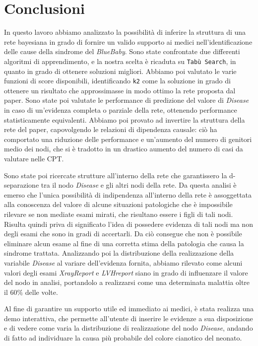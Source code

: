 \chapter{Conclusioni}
In questo lavoro abbiamo analizzato la possibilità di inferire la struttura di una rete bayesiana in grado di fornire un valido supporto ai medici nell'identificazione delle cause della sindrome del \textit{BlueBaby}. Sono state confrontate due differenti algoritmi di apprendimento, e la nostra scelta è ricaduta su \texttt{Tabù Search}, in quanto in grado di ottenere soluzioni migliori. Abbiamo poi valutato le varie funzioni di score disponibili, identificando \texttt{k2} come la soluzione in grado di ottenere un risultato che approssimasse in modo ottimo la rete proposta dal paper.
Sono state poi valutate le performance di predizione del valore di \textit{Disease} in caso di un'evidenza completa o parziale della rete, ottenendo performance statisticamente equivalenti. Abbiamo poi provato ad invertire la struttura della rete del paper, capovolgendo le relazioni di dipendenza causale: ciò ha comportato una riduzione delle performance e un'aumento del numero di genitori medio dei nodi, che si è tradotto in un drastico aumento del numero di casi da valutare nelle CPT.

Sono state poi ricercate strutture all'interno della rete che garantissero la d-separazione tra il nodo \textit{Disease} e gli altri nodi della rete. Da questa analisi è emerso che l'unica possibilità di indipendenza all'interno della rete è assoggettata alla conoscenza del valore di alcune situazioni patologiche che è impossibile rilevare se non mediate esami mirati, che risultano essere i figli di tali nodi. Risulta quindi priva di significato l'idea di possedere evidenza di tali nodi ma non degli esami che sono in gradi di accertarli. Da ciò consegue che non è possibile eliminare alcun esame al fine di una corretta stima della patologia che causa la sindrome trattata.
Analizzando poi la distribuzione della realizzazione della variabile \textit{Disease} al variare dell'evidenza fornita, abbiamo rilevato come alcuni valori degli esami \textit{XrayReport} e \textit{LVHreport} siano in grado di influenzare il valore del nodo in analisi, portandolo a realizzarsi come una determinata malattia oltre il $60\%$ delle volte.

Al fine di garantire un supporto utile ed immediato ai medici, è stata realizza una demo interattiva, che permette all'utente di inserire le evidenze a sua disposizione e di vedere come varia la distribuzione di realizzazione del nodo \textit{Disease}, andando di fatto ad individuare la causa più probabile del colore cianotico del neonato.
